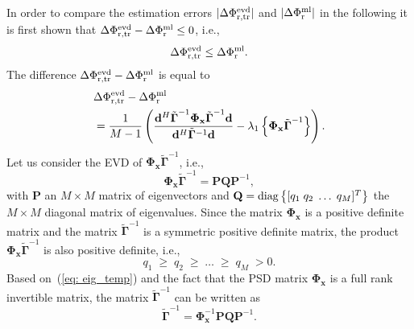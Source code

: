 \documentclass[10pt]{IEEEtran}
\begin{document}
In order to compare the estimation errors $|\Delta \Phi^{\rm evd}_{\rm r,tr}|$ and $|\Delta \Phi^{\rm ml}_{\rm r}|$ in the following it is first shown that $\Delta \Phi^{\rm evd}_{\rm r,tr} - \Delta \Phi^{\rm ml}_{\rm r} \leq 0$, i.e., 
\begin{equation}
\label{eq: diff_toshow}
\Delta \Phi^{\rm evd}_{\rm r,tr} \leq \Delta \Phi^{\rm ml}_{\rm r}.
\end{equation}
The difference $\Delta \Phi^{\rm evd}_{\rm r,tr} - \Delta \Phi^{\rm ml}_{\rm r}$ is equal to
\begin{align}
& \Delta \Phi^{\rm evd}_{\rm r,tr} - \Delta \Phi^{\rm ml}_{\rm r} \\
\label{eq: diff_coherror}
& = \frac{1}{M-1} \left( \frac{\mathbf{d}^H \tilde{\boldsymbol{\Gamma}}^{-1}  \mathbf{\Phi}_{\mathbf{x}} \tilde{\boldsymbol{\Gamma}}^{-1} \mathbf{d}}{\mathbf{d}^H  \tilde{\mathbf{\Gamma}}^{-1} \mathbf{d}} - \lambda_1 \left\{\mathbf{\Phi}_{\mathbf{x}} \tilde{\boldsymbol{\Gamma}}^{-1} \right\} \right).
\end{align}
Let us consider the EVD of $\mathbf{\Phi}_{\mathbf{x}} \tilde{\boldsymbol{\Gamma}}^{-1}$, i.e.,
\begin{equation}
\label{eq: eig_temp}
\mathbf{\Phi}_{\mathbf{x}} \tilde{\boldsymbol{\Gamma}}^{-1} = \mathbf{P} \mathbf{Q} \mathbf{P}^{-1},
\end{equation}
with $\mathbf{P}$ an $M \times M$ matrix of eigenvectors and $\mathbf{Q} = {\rm diag} \left\{ [q_1 \; q_2 \; \ldots \; q_M]^T \right\}$ the $M \times M$ diagonal matrix of eigenvalues.
Since the matrix $\mathbf{\Phi}_{\mathbf{x}}$ is a positive definite matrix and the matrix $\tilde{\boldsymbol{\Gamma}}^{-1}$ is a symmetric positive definite matrix, the product $\mathbf{\Phi}_{\mathbf{x}}\tilde{\boldsymbol{\Gamma}}^{-1}$ is also positive definite, i.e.,
\begin{equation} 
\label{eq: eigs_rxGt}
q_1 \; \geq \; q_2 \; \geq \; \ldots \; \geq \; q_M \; > 0.
\end{equation}
Based on~(\ref{eq: eig_temp}) and the fact that the PSD matrix $\mathbf{\Phi}_{\mathbf{x}}$ is a full rank invertible matrix, the matrix $\tilde{\boldsymbol{\Gamma}}^{-1}$ can be written as
\begin{equation}
\label{eq: gammatilde_exp}
\tilde{\boldsymbol{\Gamma}}^{-1} = \mathbf{\Phi}^{-1}_{\mathbf{x}}\mathbf{P} \mathbf{Q} \mathbf{P}^{-1}.
\end{equation}
\end{document}
